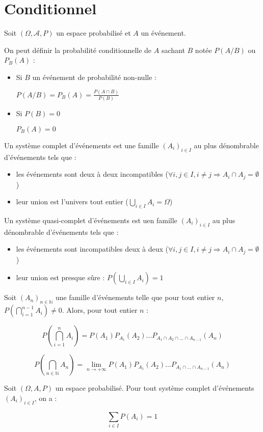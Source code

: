 \documentclass[a4paper,12pt]{book}
\newcommand{\Def}[2]{\begin{tcolorbox}[colback=white,colframe=red!10!green!20!blue!75!, title=Définition : #1]#2\end{tcolorbox}}
\newcommand{\Thr}[2]{\begin{tcolorbox}[sharp corners, colback=white,colframe=red!10!blue!30!green!75!, title=Théorème : #1]#2\end{tcolorbox}}
\def\N{\mathbb{N}}
\begin{document}
\section{Conditionnel}
\Def{}{Soit $(\Omega, \mathcal{A},P)$ un espace probabilisé et $A$ un événement.
\par On peut définir la probabilité conditionnelle de $A$ sachant $B$ notée $P(A/B)$ ou $P_B(A)$ :\begin{itemize}
\item Si $B$ un événement de probabilité non-nulle : \par\begin{center}$P(A/B)=P_B(A)=\frac{P(A\cap B)}{P(B)}$\end{center}
\item Si $P(B)=0$ \par\begin{center} $P_B(A)=0$\end{center}
\end{itemize}}
\Def{}{Un système complet d'événements est une famille $(A_i)_{i\in I}$ au plus dénombrable d'événements tels que :\begin{itemize}
\item les événements sont deux à deux incompatibles ($\forall i,j\in I, i\neq j\Rightarrow A_i\cap A_j=\emptyset$)
\item leur union est l'univers tout entier ($\bigcup_{i\in I}A_i=\Omega$)
\end{itemize}}
\Def{}{Un système quasi-complet d'événements est uen famille $(A_i)_{i\in I}$ au plus dénombrable d'événements tels que :\begin{itemize}
\item les événements sont incompatibles deux à deux ($\forall i,j\in I, i\neq j\Rightarrow A_i\cap A_j=\emptyset$)
\item leur union est presque sûre : $P\left(\bigcup_{i\in I}A_i\right)=1$
\end{itemize}}
\Thr{Formule des probabilités composées}{Soit $(A_n)_{n\in\N}$ une famille d'événements telle que pour tout entier $n$, $P\left(\bigcap_{i=1}^{n-1}A_i\right)\neq 0$. Alors, pour tout entier $n$ :
\par $$P\left(\bigcap_{i=1}^nA_i\right)=P(A_1)P_{A_1}(A_2)...P_{A_1\cap A_2\cap...\cap A_{n-1}}(A_n)$$
\par $$P\left(\bigcap_{n\in\N}A_n\right) = \lim\limits_{n\to+\infty}P(A_1)P_{A_1}(A_2)...P_{A_1\cap...\cap A_{n-1}}(A_n)$$}
\Thr{}{Soit $(\Omega, A, P)$ un espace probabilisé. Pour tout système complet d'événements $(A_i)_{i\in I}$, on a :
\par $$\sum\limits_{i\in I}P(A_i)=1$$}
\end{document}
